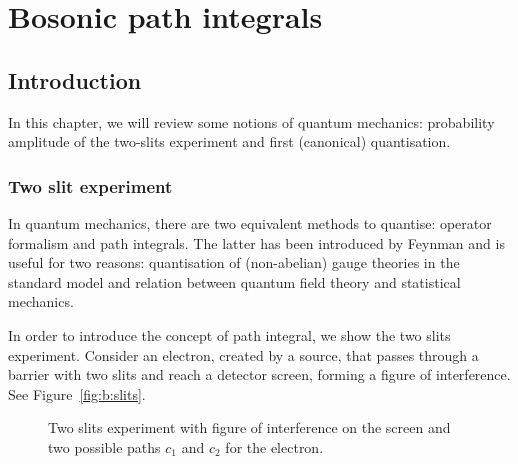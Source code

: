 \part{Bosonic path integrals}

\chapter{Introduction}

    In this chapter, we will review some notions of quantum mechanics: probability amplitude of the two-slits experiment and first (canonical) quantisation.

\section{Two slit experiment}

    In quantum mechanics, there are two equivalent methods to quantise: operator formalism and path integrals. The latter has been introduced by Feynman and is useful for two reasons: quantisation of (non-abelian) gauge theories in the standard model and relation between quantum field theory and statistical mechanics.

    In order to introduce the concept of path integral, we show the two slits experiment. Consider an electron, created by a source, that passes through a barrier with two slits and reach a detector screen, forming a figure of interference. See Figure~\eqref{fig:b:slits}. 
    
    \begin{figure}[h!]
        \centering
        \caption{Two slits experiment with figure of interference on the screen and two possible paths $c_1$ and $c_2$ for the electron.}
        \label{fig:b:slits}
    \end{figure}
    
